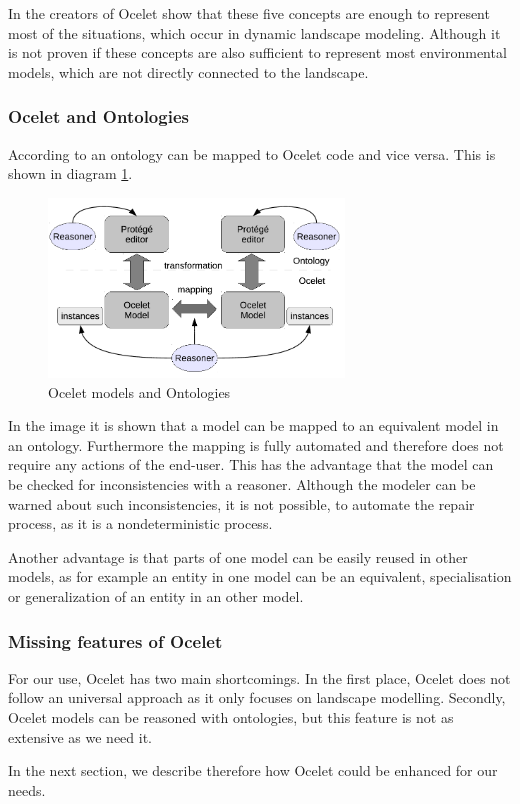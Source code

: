 \par
In \autocite{dsl:ocelet-design} the creators of Ocelet show that these five concepts are enough to represent most of the situations, which occur in dynamic landscape modeling. Although it is not proven if these concepts are also sufficient to represent most environmental models, which are not directly connected to the landscape.

\subsubsection{Ocelet and Ontologies}
\par
According to \autocite{dsl:ocelet-design} an ontology can be mapped to Ocelet code and vice versa. This is shown in diagram \ref{fig:ocelet_and_ontologies}.
\begin{figure}[h]
	\centering
	\includegraphics[width=0.7\textwidth]{pics/ocelet/ocelet_and_ontologies.png}
	\caption{Ocelet models and Ontologies  \label{fig:ocelet_and_ontologies}}	
\end{figure}
\par
In the image it is shown that a model can be mapped to an equivalent model in an ontology. Furthermore the mapping is fully automated and therefore does not require any actions of the end-user. This has the advantage that the model can be checked for inconsistencies with a reasoner. Although the modeler can be warned about such inconsistencies, it is not possible, to automate the repair process, as it is a nondeterministic process.  
\par
Another advantage is that parts of one model can be easily reused in other models, as for example an entity in one model can be an equivalent, specialisation or generalization of an entity in an other model.

\subsubsection{Missing features of Ocelet}
\par
For our use, Ocelet has two main shortcomings. In the first place, Ocelet does not follow an universal approach as it only focuses on landscape modelling. Secondly, Ocelet models can be reasoned with ontologies, but this feature is not as extensive as we need it.

\par
In the next section, we describe therefore how Ocelet could be enhanced for our needs.














